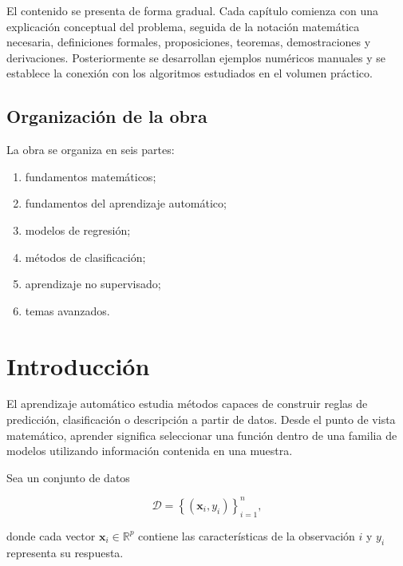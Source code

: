 \documentclass[
  spanish,
  10.5pt,
  letterpaper,
  DIV=11,
  numbers=noendperiod,
  oneside,
  open=any]{scrreprt}
\providecommand{\tightlist}{%
  \setlength{\itemsep}{0pt}\setlength{\parskip}{0pt}}
\theoremstyle{definition}
\theoremstyle{definition}
\theoremstyle{plain}
\theoremstyle{remark}
\begin{document}
El contenido se presenta de forma gradual. Cada capítulo comienza con
una explicación conceptual del problema, seguida de la notación
matemática necesaria, definiciones formales, proposiciones, teoremas,
demostraciones y derivaciones. Posteriormente se desarrollan ejemplos
numéricos manuales y se establece la conexión con los algoritmos
estudiados en el volumen práctico.

\section*{Organización de la obra}\label{organizaciuxf3n-de-la-obra}


La obra se organiza en seis partes:

\begin{enumerate}
\def\labelenumi{\arabic{enumi}.}
\tightlist
\item
  fundamentos matemáticos;
\item
  fundamentos del aprendizaje automático;
\item
  modelos de regresión;
\item
  métodos de clasificación;
\item
  aprendizaje no supervisado;
\item
  temas avanzados.
\end{enumerate}


\chapter*{Introducción}\label{introducciuxf3n}


El aprendizaje automático estudia métodos capaces de construir reglas de
predicción, clasificación o descripción a partir de datos. Desde el
punto de vista matemático, aprender significa seleccionar una función
dentro de una familia de modelos utilizando información contenida en una
muestra.

Sea un conjunto de datos

\[
\mathcal{D}
=
\left\{
(\mathbf{x}_i,y_i)
\right\}_{i=1}^{n},
\]

donde cada vector \(\mathbf{x}_i\in\mathbb{R}^{p}\) contiene las
características de la observación \(i\) y \(y_i\) representa su
respuesta.
\end{document}
